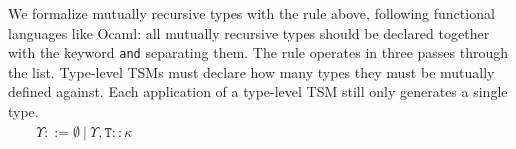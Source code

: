 \documentclass{sig-alternate}
\newcommand{\flyingbox}[1]{\fbox{{#1}}}
\newcommand{\T}{\mathtt{T}}
\begin{document}
%

\begin{center}
\DP
\end{center}

We formalize mutually recursive types with the rule above, following functional languages like Ocaml: all mutually recursive types should be declared together with the keyword \verb|and| separating them. The rule operates in three passes through the list. Type-level TSMs must declare how many types they must be mutually defined against. Each application of a type-level TSM still only generates a single type. \\

\flyingbox{$\vdash_{\Theta}^\Psi \theta \sim \Upsilon$}~~~~$\Upsilon ::= \emptyset ~|~ \Upsilon, \mathtt{T} :: \kappa$\\
\end{document}
